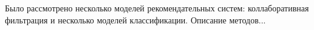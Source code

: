 Было рассмотрено несколько моделей рекомендательных систем: коллаборативная
фильтрация и несколько моделей классификации.
Описание методов...
